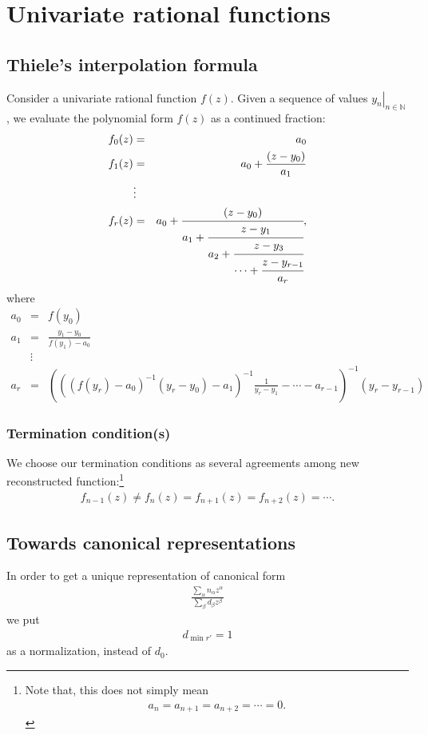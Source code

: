 \documentclass[11pt]{book}
\begin{document}
\section{Univariate rational functions}
\subsection{Thiele's interpolation formula}
Consider a univariate rational function $f(z)$.
Given a sequence of values $\left. y_n \right|_{n \in \mathbb{N}}$, we evaluate the polynomial form $f(z)$ as a continued fraction:
\begin{eqnarray}
f_0(z) &=& a_0 \\
f_1(z) &=& a_0 + \frac{(z-y_0)}{a_1} \\
\nonumber
&\vdots& \\
f_r(z) &=& a_0 + \cfrac{(z-y_0)}{a_1 + \cfrac{z-y_1}{a_2 + \cfrac{z- y_3}{\cdots + \cfrac{z-y_{r-1}}{a_r}}}},
\end{eqnarray}
where
\begin{eqnarray}
a_0 &=& f(y_0) \\
a_1 &=& \frac{y_1 - y_0}{f(y_1) - a_0}\\
\nonumber
&\vdots& \\
a_r &=& \left( \left( \left( f(y_r)-a_0 \right)^{-1} (y_r - y_0) - a_1 \right)^{-1} \frac{1}{y_r - y_1} - \cdots - a_{r-1} \right)^{-1} (y_r - y_{r-1}) \qquad\qquad
\end{eqnarray}

\subsubsection{Termination condition(s)}
We choose our termination conditions as several agreements among new reconstructed function:\footnote{
Note that, this does not simply mean
\begin{eqnarray}
a_{n} = a_{n+1} = a_{n+2} = \cdots = 0.
\end{eqnarray}
}
\begin{eqnarray}
f_{n-1}(z) \neq f_n(z) = f_{n+1}(z) = f_{n+2}(z) = \cdots.
\end{eqnarray}

\subsection{Towards canonical representations}
In order to get a unique representation of canonical form
\begin{eqnarray}
\frac{\sum_\alpha n_\alpha z^\alpha}{\sum_\beta d_\beta z^\beta}
\end{eqnarray}
we put
\begin{eqnarray}
d_{\min r'} = 1
\end{eqnarray}
as a normalization, instead of $d_0$.
\end{document}
